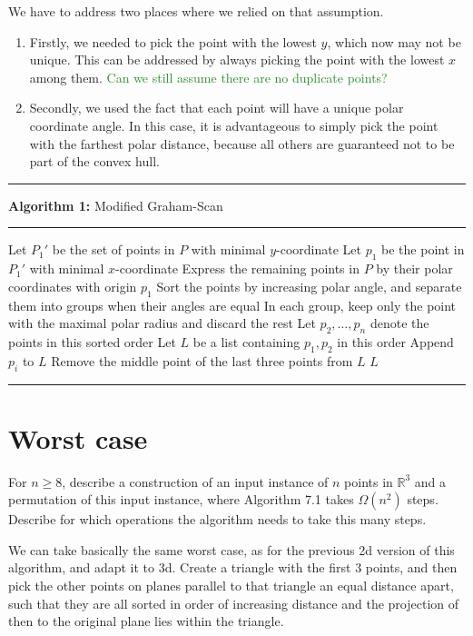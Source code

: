 \documentclass{article}
\newcommand{\R}{\mathbb{R}}
\newcommand{\algorithmRuledHeader}[2]{\hrule height.8pt \vspace{2pt}\textbf{Algorithm #1:} #2\vspace{2pt}\hrule}
\begin{document}
  We have to address two places where we relied on that assumption.
  \begin{enumerate}
    \item
    Firstly, we needed to pick the point with the lowest $y$, which now may not be unique.
    This can be addressed by always picking the point with the lowest $x$ among them.
    \textcolor{ForestGreen}{Can we still assume there are no duplicate points?}

    \item Secondly, we used the fact that each point will have a unique polar coordinate angle.
    In this case, it is advantageous to simply pick the point with the farthest polar distance,
    because all others are guaranteed not to be part of the convex hull.
  \end{enumerate}

  \algorithmRuledHeader{1}{Modified Graham-Scan}
  \begin{algorithmic}[1]
    \Procedure{Convex-Hull}{Set of points $P$ in $\R^2$}
      \State Let $P_1'$ be the set of points in $P$ with minimal $y$-coordinate
      \State Let $p_1$ be the point in $P_1'$ with minimal $x$-coordinate
      \State Express the remaining points in $P$ by their polar coordinates with origin $p_1$
      \State Sort the points by increasing polar angle, and separate them into groups when their angles are equal
      \State In each group, keep only the point with the maximal polar radius and discard the rest
      \State Let $p_2, \ldots, p_n$ denote the points in this sorted order
      \Comment{\textcolor{ForestGreen}{After this line the algorithm remains unaltered}}
      \State Let $L$ be a list containing $p_1, p_2$ in this order
        \State Append $p_i$ to $L$
          \State Remove the middle point of the last three points from $L$
        \EndWhile
      \EndFor
      \State \Return $L$
    \EndProcedure
  \end{algorithmic}
  \hrule

  \section{Worst case}
  \begin{centerframebox}
    For $n \geq 8$, describe a construction of an input instance of $n$ points in $\R^3$ and a permutation
    of this input instance, where Algorithm 7.1 takes $\Omega(n^2)$ steps. Describe for which operations
    the algorithm needs to take this many steps.
  \end{centerframebox}
  We can take basically the same worst case, as for the previous 2d version of this algorithm, and adapt it to 3d.
  Create a triangle with the first 3 points, and then pick the other points on planes parallel to that triangle an equal distance apart,
  such that they are all sorted in order of increasing distance and the projection of then to the original plane lies within the triangle.
\end{document}
